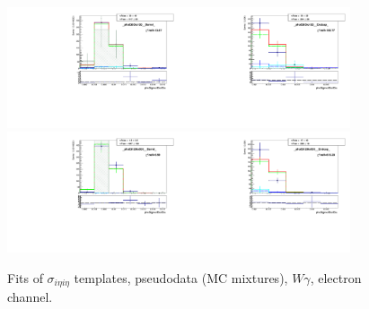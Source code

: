 \begin{figure}[htb]
\begin{center}
   \includegraphics[width=0.45\textwidth]{../figs/figs_v11/ELECTRON_WGamma/TemplateFits/c_TEMPL_SIHIH_UNblind__phoEt95to120__Barrel__RooFit_MCclosure.pdf}\includegraphics[width=0.45\textwidth]{../figs/figs_v11/ELECTRON_WGamma/TemplateFits/c_TEMPL_SIHIH_UNblind__phoEt95to120__Endcap__RooFit_MCclosure.pdf}\\
   \includegraphics[width=0.45\textwidth]{../figs/figs_v11/ELECTRON_WGamma/TemplateFits/c_TEMPL_SIHIH_UNblind__phoEt120to500__Barrel__RooFit_MCclosure.pdf}\includegraphics[width=0.45\textwidth]{../figs/figs_v11/ELECTRON_WGamma/TemplateFits/c_TEMPL_SIHIH_UNblind__phoEt120to500__Endcap__RooFit_MCclosure.pdf}\\
  \label{fig:templateFits_MCclosure_SIHIH_ELECTRON_3}
  \caption{Fits of $\sigma_{i \eta i \eta}$ templates, pseudodata (MC mixtures), $W\gamma$, electron channel.}
  \end{center}
\end{figure}



